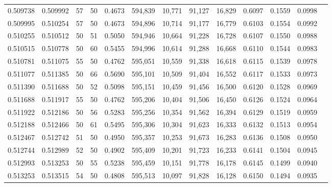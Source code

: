 \begin{tabular}{rrrrrrrrrrrrr}
0.509738 & 0.509992 &    57 &  50 &                                     0.4673 & 594,839 &  10,771 &  91,127 &  16,829 & 0.6097 & 0.1559 & 0.0998 \\
0.509995 & 0.510254 &    57 &  50 &                                     0.4673 & 594,896 &  10,714 &  91,177 &  16,779 & 0.6103 & 0.1554 & 0.0992 \\
0.510255 & 0.510512 &    50 &  51 &                                     0.5050 & 594,946 &  10,664 &  91,228 &  16,728 & 0.6107 & 0.1550 & 0.0988 \\
0.510515 & 0.510778 &    50 &  60 &                                     0.5455 & 594,996 &  10,614 &  91,288 &  16,668 & 0.6110 & 0.1544 & 0.0983 \\
0.510781 & 0.511075 &    55 &  50 &                                     0.4762 & 595,051 &  10,559 &  91,338 &  16,618 & 0.6115 & 0.1539 & 0.0978 \\
0.511077 & 0.511385 &    50 &  66 &                                     0.5690 & 595,101 &  10,509 &  91,404 &  16,552 & 0.6117 & 0.1533 & 0.0973 \\
0.511390 & 0.511688 &    50 &  52 &                                     0.5098 & 595,151 &  10,459 &  91,456 &  16,500 & 0.6120 & 0.1528 & 0.0969 \\
0.511688 & 0.511917 &    55 &  50 &                                     0.4762 & 595,206 &  10,404 &  91,506 &  16,450 & 0.6126 & 0.1524 & 0.0964 \\
0.511922 & 0.512186 &    50 &  56 &                                     0.5283 & 595,256 &  10,354 &  91,562 &  16,394 & 0.6129 & 0.1519 & 0.0959 \\
0.512188 & 0.512466 &    50 &  61 &                                     0.5495 & 595,306 &  10,304 &  91,623 &  16,333 & 0.6132 & 0.1513 & 0.0954 \\
0.512467 & 0.512742 &    51 &  50 &                                     0.4950 & 595,357 &  10,253 &  91,673 &  16,283 & 0.6136 & 0.1508 & 0.0950 \\
0.512744 & 0.512989 &    52 &  50 &                                     0.4902 & 595,409 &  10,201 &  91,723 &  16,233 & 0.6141 & 0.1504 & 0.0945 \\
0.512993 & 0.513253 &    50 &  55 &                                     0.5238 & 595,459 &  10,151 &  91,778 &  16,178 & 0.6145 & 0.1499 & 0.0940 \\
0.513253 & 0.513515 &    54 &  50 &                                     0.4808 & 595,513 &  10,097 &  91,828 &  16,128 & 0.6150 & 0.1494 & 0.0935 \\

\end{tabular}
